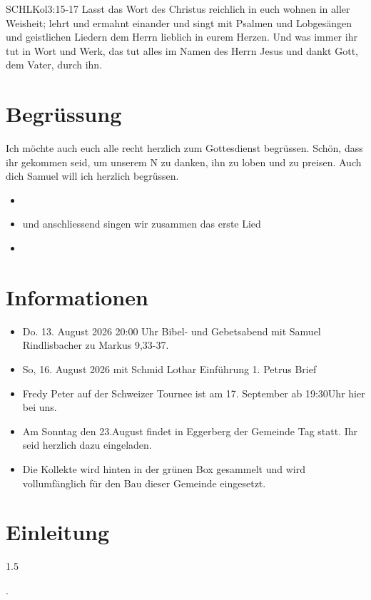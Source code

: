 \documentclass[fontsize=14pt]{mybib}
\author{OTS}
\newcommand{\Name}{Samuel}
\begin{document}
\begin{bibelbox}{SCHL}{Kol}{3:15-17}
    Lasst das Wort des Christus reichlich in euch wohnen in aller Weisheit; lehrt und ermahnt einander und singt mit Psalmen und Lobgesängen und geistlichen Liedern dem Herrn lieblich in eurem Herzen. Und was immer ihr tut in Wort und Werk, das tut alles im Namen des Herrn Jesus und dankt Gott, dem Vater, durch ihn.
\end{bibelbox}
\section{Begrüssung}
Ich möchte auch euch alle recht herzlich zum Gottesdienst begrüssen. Schön, dass ihr gekommen seid, um unserem \herr N zu danken, ihn zu loben und zu preisen. 
Auch dich \Name{} will ich herzlich begrüssen. 

\begin{itemize}
    \item[] 
    \item[] und anschliessend singen wir zusammen das erste Lied
    \item[] 
\end{itemize}
\section{Informationen}
\begin{itemize}
    \item {} Do. 13. August 2026 20:00 Uhr Bibel- und Gebetsabend mit Samuel Rindlisbacher zu Markus 9,33-37.\\
    \item {} So, 16. August 2026 mit Schmid Lothar Einführung 1. Petrus Brief
    \item {} 
        Fredy Peter auf der Schweizer Tournee ist am 17. September ab 19:30Uhr hier bei uns.
    \item Am Sonntag den 23.August findet in Eggerberg der Gemeinde Tag statt. Ihr seid herzlich dazu eingeladen. 
    \item {} Die Kollekte wird hinten in der grünen Box gesammelt und wird vollumfänglich für den Bau dieser Gemeinde eingesetzt.
\end{itemize}
\section{Einleitung}
\begin{spacing}{1.5}
      
\end{spacing}
.
\end{document}
